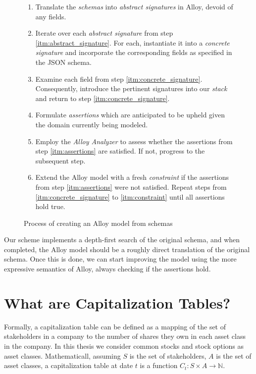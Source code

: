 \begin{figure}[ht!]
\centering
	\begin{minipage}{.8\linewidth}
		\begin{enumerate}
			\item\label{itm:abstract_signature} Translate the \textit{schemas} into \textit{abstract signatures} in Alloy, devoid of any fields.
			\item\label{itm:concrete_signature} Iterate over each \textit{abstract signature} from step \ref{itm:abstract_signature}. For each, instantiate it into a \textit{concrete signature} and incorporate the corresponding fields as specified in the JSON schema.
			\item\label{itm:related_signatures} Examine each field from step \ref{itm:concrete_signature}. Consequently, introduce the pertinent signatures into our \textit{stack} and return to step \ref{itm:concrete_signature}.
			\item\label{itm:assertions} Formulate \textit{assertions} which are anticipated to be upheld given the domain currently being modeled.
			\item\label{itm:analyzer} Employ the \textit{Alloy Analyzer} to assess whether the assertions from step \ref{itm:assertions} are satisfied. If not, progress to the subsequent step.
			\item\label{itm:constraint} Extend the Alloy model with a fresh \textit{constraint} if the assertions from step \ref{itm:assertions} were not satisfied. Repeat steps from \ref{itm:concrete_signature} to \ref{itm:constraint} until all assertions hold true.
		\end{enumerate}
	\end{minipage}
\caption{Process of creating an Alloy model from schemas}
\label{fig:json-to-alloy-translation-algorithm}
\end{figure}  

Our scheme implements a depth-first search of the original schema, and when completed, the Alloy model should be a roughly direct translation of the original schema. Once this is done, we can start improving the model using the more expressive semantics of Alloy, always checking if the assertions hold.

\section{What are Capitalization Tables?}

Formally, a capitalization table can be defined as a mapping of the set of stakeholders in a company to the number of shares they own in each asset class in the company. In this thesis we consider common stocks and stock options as asset classes. Mathematicall, assuming $S$ is the set of stakeholders, $A$ is the set of asset classes, a capitalization table at date $t$ is a function $C_t: S \times A \rightarrow \mathbb{N}$.

